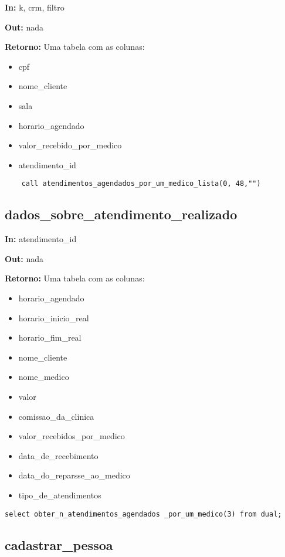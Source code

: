\textbf{In:} k, crm, filtro

\textbf{Out:} nada

\textbf{Retorno:} Uma tabela com as colunas:

\begin{itemize}
	\item cpf
	\item nome\_cliente
	\item sala
	\item horario\_agendado
	\item valor\_recebido\_por\_medico
	\item atendimento\_id
\end{itemize}

\begin{verbatim}
	call atendimentos_agendados_por_um_medico_lista(0, 48,"")
\end{verbatim}

\subsection{dados\_sobre\_atendimento\_realizado}

\textbf{In:} atendimento\_id

\textbf{Out:} nada

\textbf{Retorno:} Uma tabela com as colunas:

\begin{itemize}
\item horario\_agendado
\item horario\_inicio\_real
\item horario\_fim\_real
\item nome\_cliente
\item nome\_medico
\item valor
\item comissao\_da\_clinica
\item valor\_recebidos\_por\_medico
\item data\_de\_recebimento
\item data\_do\_reparsse\_ao\_medico
\item tipo\_de\_atendimentos
\end{itemize}

\begin{verbatim}
select obter_n_atendimentos_agendados _por_um_medico(3) from dual;
\end{verbatim}


\subsection{cadastrar\_pessoa}

